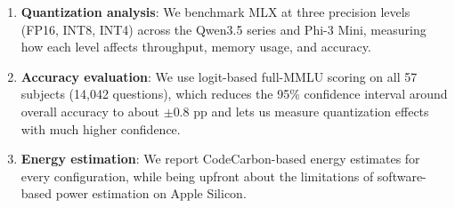 \documentclass[11pt,a4paper]{article}
\begin{document}
\begin{enumerate}[leftmargin=*,nosep]
    \item \textbf{Quantization analysis}: We benchmark MLX at three precision levels (FP16, INT8, INT4) across the Qwen3.5 series and Phi-3 Mini, measuring how each level affects throughput, memory usage, and accuracy.

    \item \textbf{Accuracy evaluation}: We use logit-based full-MMLU scoring on all 57 subjects (14,042 questions), which reduces the 95\% confidence interval around overall accuracy to about $\pm 0.8$ pp and lets us measure quantization effects with much higher confidence.

    \item \textbf{Energy estimation}: We report CodeCarbon-based energy estimates for every configuration, while being upfront about the limitations of software-based power estimation on Apple Silicon.
\end{enumerate}
\end{document}
